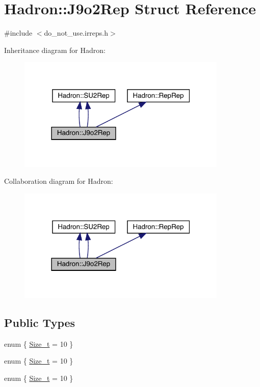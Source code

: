 \hypertarget{structHadron_1_1J9o2Rep}{}\section{Hadron\+:\+:J9o2\+Rep Struct Reference}
\label{structHadron_1_1J9o2Rep}


{\ttfamily \#include $<$do\+\_\+not\+\_\+use.\+irreps.\+h$>$}



Inheritance diagram for Hadron\+:\nopagebreak
\begin{figure}[H]
\begin{center}
\leavevmode
\includegraphics[width=283pt]{dd/d8d/structHadron_1_1J9o2Rep__inherit__graph}
\end{center}
\end{figure}


Collaboration diagram for Hadron\+:\nopagebreak
\begin{figure}[H]
\begin{center}
\leavevmode
\includegraphics[width=283pt]{d7/d40/structHadron_1_1J9o2Rep__coll__graph}
\end{center}
\end{figure}
\subsection*{Public Types}
\begin{DoxyCompactItemize}
\item 
enum \{ \mbox{\hyperlink{structHadron_1_1J9o2Rep_a1b58d6d41ec9bf8e0d82c0c8b7f50121a09b9294087bdd9522fa9c8db5825d0db}{Size\+\_\+t}} = 10
 \}
\item 
enum \{ \mbox{\hyperlink{structHadron_1_1J9o2Rep_a1b58d6d41ec9bf8e0d82c0c8b7f50121a09b9294087bdd9522fa9c8db5825d0db}{Size\+\_\+t}} = 10
 \}
\item 
enum \{ \mbox{\hyperlink{structHadron_1_1J9o2Rep_a1b58d6d41ec9bf8e0d82c0c8b7f50121a09b9294087bdd9522fa9c8db5825d0db}{Size\+\_\+t}} = 10
 \}
\end{DoxyCompactItemize}
